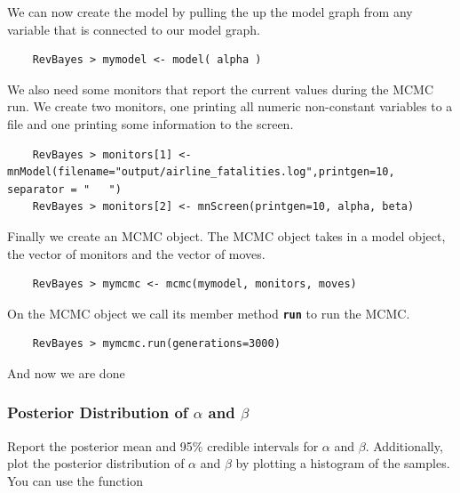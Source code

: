 \documentclass[11pt]{article}
\newcommand{\cl}[1]{{\texttt{\textbf{#1}}}}
\begin{document}
We can now create the model by pulling the up the model graph from any variable that is connected to our model graph.
{\tt \begin{snugshade*}
\begin{lstlisting} 
    RevBayes > mymodel <- model( alpha )
\end{lstlisting}
\end{snugshade*}}
We also need some monitors that report the current values during the MCMC run.
We create two monitors, one printing all numeric non-constant variables to a file and one printing some information to the screen.
{\tt \begin{snugshade*}
\begin{lstlisting} 
    RevBayes > monitors[1] <- mnModel(filename="output/airline_fatalities.log",printgen=10, separator = "	")
    RevBayes > monitors[2] <- mnScreen(printgen=10, alpha, beta)
\end{lstlisting}
\end{snugshade*}}
Finally we create an MCMC object.
The MCMC object takes in a model object, the vector of monitors and the vector of moves.
{\tt \begin{snugshade*}
\begin{lstlisting} 
    RevBayes > mymcmc <- mcmc(mymodel, monitors, moves)
\end{lstlisting}
\end{snugshade*}}
On the MCMC object we call its member method \cl{run} to run the MCMC.
{\tt \begin{snugshade*}
\begin{lstlisting} 
    RevBayes > mymcmc.run(generations=3000)
\end{lstlisting}
\end{snugshade*}}
And now we are done {\LARGE \smiley}


\subsubsection*{Posterior Distribution of $\alpha$ and $\beta$}
 
Report the posterior mean and 95\% credible intervals for $\alpha$ and $\beta$. 
Additionally, plot the posterior distribution of $\alpha$ and $\beta$ by plotting a histogram of the samples. 
You can use the \R function
\end{document}
